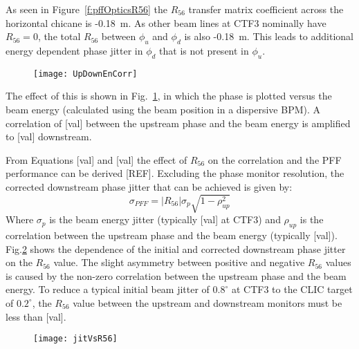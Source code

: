 As seen in Figure~\ref{f:pffOpticsR56} the \(R_{56}\) transfer matrix 
coefficient across the horizontal chicane is -0.18~m. As other beam lines at 
CTF3 nominally have \(R_{56}=0\), the total \(R_{56}\) between \(\phi_u\) and 
\(\phi_d\) is also -0.18~m. This leads to additional energy dependent phase 
jitter in \(\phi_d\) that is not present in \(\phi_u\).

\begin{figure}
  \centering
  \texttt{[image: UpDownEnCorr]}
  \caption{\label{f:UpDownEnCorr}
  }
\end{figure}

The effect of this is shown in Fig.~\ref{f:UpDownEnCorr}, in which the phase is 
plotted versus the beam energy (calculated using the beam position in a 
dispersive BPM). A correlation of [val] between the upstream phase and the beam 
energy is amplified to [val] downstream.

From Equations [val] and [val] the effect of \(R_{56}\) on the correlation and 
the PFF performance can be derived [REF]. Excluding the phase monitor 
resolution, the 
corrected downstream phase jitter that can be achieved is given by:
\begin{equation}
\sigma_{PFF} = \left|R_{56}\right|\sigma_p\sqrt{1-\rho_{up}^2}
\label{e:r56PFFJit}
\end{equation}
Where \(\sigma_p\) is the beam energy jitter (typically [val] at CTF3) and 
\(\rho_{up}\) is the correlation between the upstream phase and the beam energy 
(typically [val]). Fig.\ref{f:jitVsR56} shows the dependence of the initial and 
corrected downstream phase jitter on the \(R_{56}\) value. The slight asymmetry 
between positive and negative \(R_{56}\) values is caused by the non-zero 
correlation between the upstream phase and the beam energy. To reduce a typical 
initial beam jitter of \(0.8^\circ\) at CTF3 to the CLIC target of 
\(0.2^\circ\), the \(R_{56}\) value between the upstream and downstream 
monitors must be less than [val].

\begin{figure}
 \centering
  \texttt{[image: jitVsR56]}
  \caption{\label{f:jitVsR56}
  }
\end{figure}



